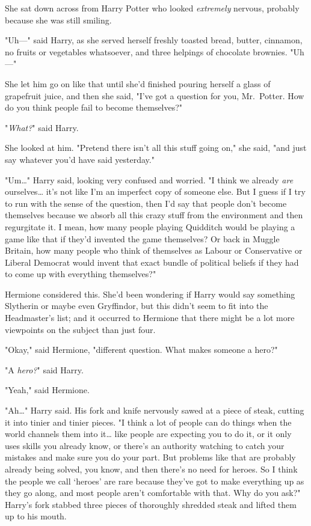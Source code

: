 She sat down across from Harry Potter who looked \emph{extremely} nervous, 
probably because she was still smiling.

"Uh---" said Harry, as she served herself freshly toasted bread, butter, 
cinnamon, no fruits or vegetables whatsoever, and three helpings of chocolate 
brownies. "Uh---"

She let him go on like that until she'd finished pouring herself a glass of 
grapefruit juice, and then she said, "I've got a question for you, Mr.~Potter. 
How do you think people fail to become themselves?"

"\emph{What?}" said Harry.

She looked at him. "Pretend there isn't all this stuff going on," she said, 
"and just say whatever you'd have said yesterday."

"Um{\ldots}" Harry said, looking very confused and worried. "I think we already 
\emph{are} ourselves{\ldots} it's not like I'm an imperfect copy of someone 
else. But I guess if I try to run with the sense of the question, then I'd say 
that people don't become themselves because we absorb all this crazy stuff from 
the environment and then regurgitate it. I mean, how many people playing 
Quidditch would be playing a game like that if they'd invented the game 
themselves? Or back in Muggle Britain, how many people who think of themselves 
as Labour or Conservative or Liberal Democrat would invent that exact bundle of 
political beliefs if they had to come up with everything themselves?"

Hermione considered this. She'd been wondering if Harry would say something 
Slytherin or maybe even Gryffindor, but this didn't seem to fit into the 
Headmaster's list; and it occurred to Hermione that there might be a lot more 
viewpoints on the subject than just four.

"Okay," said Hermione, "different question. What makes someone a hero?"

"A \emph{hero?}" said Harry.

"Yeah," said Hermione.

"Ah{\ldots}" Harry said. His fork and knife nervously sawed at a piece of 
steak, cutting it into tinier and tinier pieces. "I think a lot of people can 
do things when the world channels them into it{\ldots} like people are 
expecting you to do it, or it only uses skills you already know, or there's an 
authority watching to catch your mistakes and make sure you do your part. But 
problems like that are probably already being solved, you know, and then 
there's no need for heroes. So I think the people we call `heroes' are rare 
because they've got to make everything up as they go along, and most people 
aren't comfortable with that. Why do you ask?" Harry's fork stabbed three 
pieces of thoroughly shredded steak and lifted them up to his mouth.

